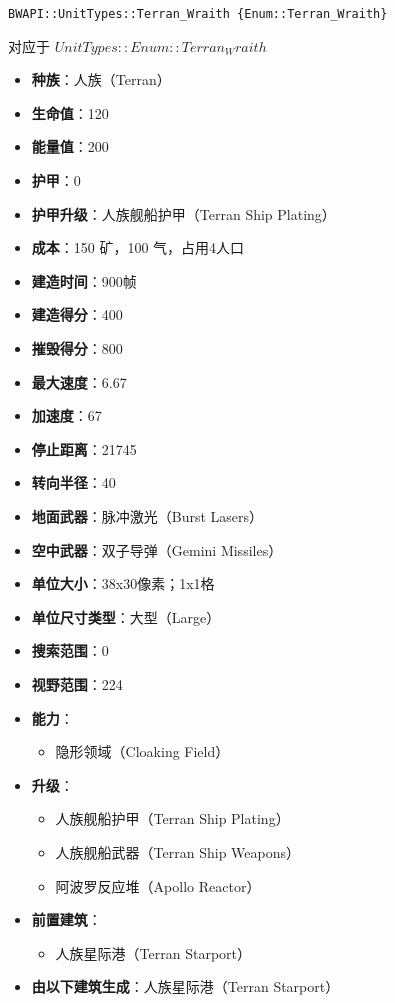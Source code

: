 \begin{tcolorbox}[colback=white, colframe=black!60!white, title=Terran\_Wraith(), arc=0mm]
    \begin{verbatim}
BWAPI::UnitTypes::Terran_Wraith {Enum::Terran_Wraith}
    \end{verbatim}
    对应于  $ UnitTypes::Enum::Terran_Wraith $ 
    \begin{itemize}
        \item \textbf{种族}：人族（Terran）
        \item \textbf{生命值}：120
        \item \textbf{能量值}：200
        \item \textbf{护甲}：0
        \item \textbf{护甲升级}：人族舰船护甲（Terran Ship Plating）
        \item \textbf{成本}：150 矿，100 气，占用4人口
        \item \textbf{建造时间}：900帧
        \item \textbf{建造得分}：400
        \item \textbf{摧毁得分}：800
        \item \textbf{最大速度}：6.67
        \item \textbf{加速度}：67
        \item \textbf{停止距离}：21745
        \item \textbf{转向半径}：40
        \item \textbf{地面武器}：脉冲激光（Burst Lasers）
        \item \textbf{空中武器}：双子导弹（Gemini Missiles）
        \item \textbf{单位大小}：38x30像素；1x1格
        \item \textbf{单位尺寸类型}：大型（Large）
        \item \textbf{搜索范围}：0
        \item \textbf{视野范围}：224
        \item \textbf{能力}：
            \begin{itemize}
                \item 隐形领域（Cloaking Field）
            \end{itemize}
        \item \textbf{升级}：
            \begin{itemize}
                \item 人族舰船护甲（Terran Ship Plating）
                \item 人族舰船武器（Terran Ship Weapons）
                \item 阿波罗反应堆（Apollo Reactor）
            \end{itemize}
        \item \textbf{前置建筑}：
            \begin{itemize}
                \item 人族星际港（Terran Starport）
            \end{itemize}
        \item \textbf{由以下建筑生成}：人族星际港（Terran Starport）
    \end{itemize}
\end{tcolorbox}
